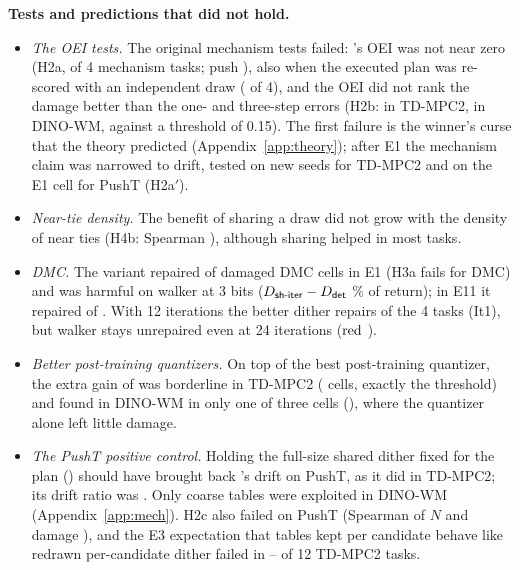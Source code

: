 \textbf{Tests and predictions that did not hold.}
\begin{itemize}\setlength{\itemsep}{1pt}\setlength{\parskip}{0pt}
\item \emph{The OEI tests.} The original mechanism tests failed: \shiter's OEI was not near zero (H2a,  of 4 mechanism tasks; push ), also when the executed plan was re-scored with an independent draw ( of 4), and the OEI did not rank the damage better than the one- and three-step errors (H2b:  in TD-MPC2,  in DINO-WM, against a threshold of 0.15). The first failure is the winner's curse that the theory predicted (Appendix~\ref{app:theory}); after E1 the mechanism claim was narrowed to drift, tested on new seeds for TD-MPC2 and on the E1 cell for PushT (H2a$'$).
\item \emph{Near-tie density.} The benefit of sharing a draw did not grow with the density of near ties (H4b: Spearman ), although sharing helped in most tasks.
\item \emph{DMC.} The variant \shiter repaired  of  damaged DMC cells in E1 (H3a fails for DMC) and was harmful on walker at 3 bits ($D_{\textsf{sh-iter}}-D_{\textsf{det}}$ \% of return); in E11 it repaired  of . With 12 iterations the better dither repairs  of the 4 tasks (It1), but walker stays unrepaired even at 24 iterations ($\mathrm{red}$ ).
\item \emph{Better post-training quantizers.} On top of the best post-training quantizer, the extra gain of \shiter was borderline in TD-MPC2 ( cells, exactly the threshold) and found in DINO-WM in only one of three cells (), where the quantizer alone left little damage.
\item \emph{The PushT positive control.} Holding the full-size shared dither fixed for the plan (\shplan) should have brought back \dtm's drift on PushT, as it did in TD-MPC2; its drift ratio was . Only coarse tables were exploited in DINO-WM (Appendix~\ref{app:mech}). H2c also failed on PushT (Spearman of $N$ and damage ), and the E3 expectation that tables kept per candidate behave like redrawn per-candidate dither failed in -- of 12 TD-MPC2 tasks.

\end{itemize}
